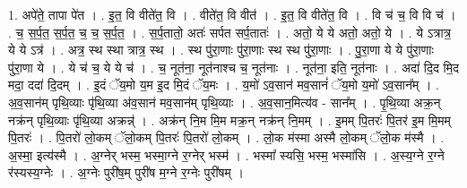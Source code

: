 \documentclass[17pt]{extarticle}
\begin{document}
1. अपे॑ते॒ तापा पे॑त । . इ॒त॒ वि वीते॑त॒ वि । . वीते॑त॒ वि वीत॑ । . इ॒त॒ वि वीते॑त॒ वि । . वि च॑ च॒ वि वि च॑ । . च॒ स॒र्प॒त॒ स॒र्प॒त॒ च॒ च॒ स॒र्प॒त॒ । . स॒र्प॒तातो॒ अतः॑ सर्पत सर्प॒तातः॑ । . अतो॒ ये ये अतो॒ अतो॒ ये । . ये ऽत्रात्र॒ ये ये ऽत्र॑ । . अत्र॒ स्थ स्था त्रात्र॒ स्थ । . स्थ पु॑रा॒णाः पु॑रा॒णाः स्थ स्थ पु॑रा॒णाः । . पु॒रा॒णा ये ये पु॑रा॒णाः पु॑रा॒णा ये । . ये च॑ च॒ ये ये च॑ । . च॒ नूत॑ना॒ नूत॑नाश्च च॒ नूत॑नाः । . नूत॑ना॒ इति॒ नूत॑नाः । . अदा॑ दि॒द मि॒द मदा॒ ददा॑ दि॒दम् । . इ॒दं ॅय॒मो य॒म इ॒द मि॒दं ॅय॒मः । . य॒मो॑ ऽव॒सान॑ मव॒सानं॑ ॅय॒मो य॒मो॑ ऽव॒सान᳚म् । . अ॒व॒सान॑म् पृथि॒व्याः पृ॑थि॒व्या अ॑व॒सान॑ मव॒सान॑म् पृथि॒व्याः । . अ॒व॒सान॒मित्य॑व - सान᳚म् । . पृ॒थि॒व्या अक्र॒न् नक्र॑न् पृथि॒व्याः पृ॑थि॒व्या अक्रन्न्॑ । . अक्र॑न् नि॒म मि॒म मक्र॒न् नक्र॑न् नि॒मम् । . इ॒मम् पि॒तरः॑ पि॒तर॑ इ॒म मि॒मम् पि॒तरः॑ । . पि॒तरो॑ लो॒कम् ॅलो॒कम् पि॒तरः॑ पि॒तरो॑ लो॒कम् । . लो॒क म॑स्मा अस्मै लो॒कम् ॅलो॒क म॑स्मै । . अ॒स्मा॒ इत्य॑स्मै । . अ॒ग्नेर् भस्म॒ भस्मा॒ग्ने र॒ग्नेर् भस्म॑ । . भस्मा᳚ स्यसि॒ भस्म॒ भस्मा॑सि । . अ॒स्य॒ग्ने र॒ग्ने र॑स्यस्य॒ग्नेः । . अ॒ग्नेः पुरी॑ष॒म् पुरी॑ष म॒ग्ने र॒ग्नेः पुरी॑षम् । \newline
\end{document}
